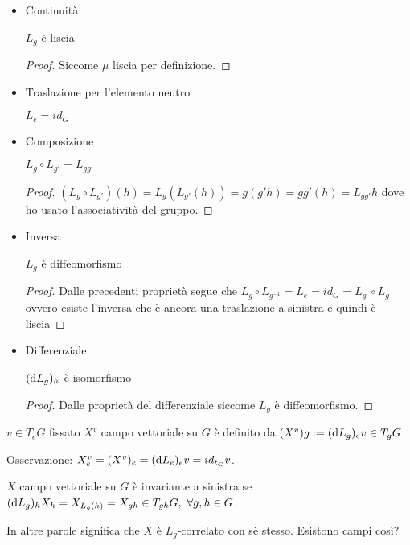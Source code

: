 \begin{itemize}
    \item Continuità
        \begin{prpr}
            $L_g$ è liscia
        \end{prpr}
        \begin{proof}
            Siccome $\mu$ liscia per definizione.
        \end{proof}
    \item Traslazione per l'elemento neutro
        \begin{prpr}
            $L_e=id_G$
        \end{prpr}
    \item Composizione
        \begin{prpr}
            $L_g\circ L_{g'}=L_{gg'}$
        \end{prpr}
        \begin{proof}
            $(L_g\circ L_{g'})(h)
            =L_g(L_{g'}(h))=g(g'h)=gg'(h)=L_{gg'}h$ dove ho usato
            l'associatività del gruppo.
        \end{proof}
    \item Inversa
        \begin{prpr}
            $L_g$ è diffeomorfismo
        \end{prpr}
        \begin{proof}
            Dalle precedenti proprietà segue che $L_g\circ
            L_{g^{-1}}=L_e=id_G=L_{g'}\circ L_g$ ovvero esiste
            l'inversa che è ancora una traslazione a sinistra e
            quindi è liscia
        \end{proof}
    \item Differenziale
        \begin{prpr}
            $(\dd{L_g})_{h}$ è isomorfismo
        \end{prpr}
        \begin{proof}
            Dalle proprietà del differenziale siccome $L_g$ è
            diffeomorfismo.
        \end{proof}

\end{itemize}

\begin{definition}[Campi $X^v$]
    $v\in T_eG$ fissato $X^v$ campo vettoriale su $G$ è definito da
    $(X^v)g:=(\dd{L_g})_{e}v\in T_gG$
\end{definition}
Osservazione: $X^v_e=(X^v)_e=(\dd{L_e})_{e}v=id_{t_G}v$.

\begin{definition}
    $X$ campo vettoriale su $G$ è invariante a sinistra se
    $(\dd{L_g})_{h}X_h=X_{L_g(h)}=X_{gh}\in T_{gh}G,\,\,\forall g,h\in
    G$.
\end{definition}
In altre parole significa che $X$ è $L_g$-correlato con sè stesso.
Esistono campi così?

